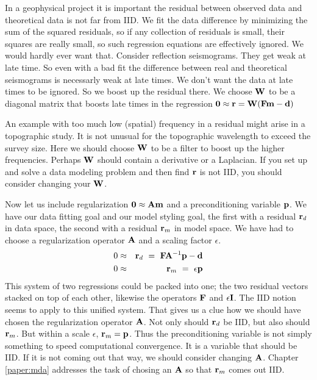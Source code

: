 \par
In a geophysical project
it is important the residual between observed data and theoretical data is not far from IID.
We fit the data difference by minimizing the sum of the squared residuals,
so if any collection of residuals is small,
their squares are really small,
so such regression equations are effectively ignored.
We would hardly ever want that.
Consider reflection seismograms.   They get weak at late time.
So even with a bad fit the difference between real and theoretical seismograms
is necessarly weak at late times.
We don't want the data at late times to be ignored.
So we boost up the residual there.
We choose $\bold W$ to be a diagonal matrix that boosts late times
in the regression $\bold 0 \approx \bold r = \bold W(\bold F\bold m-\bold d)$
\par
An example with too much low (spatial) frequency in a residual might arise in a topographic study.
It is not unusual for the topographic wavelength to exceed the survey size.
Here we should choose $\bold W$ to be a filter to boost up the higher frequencies.
Perhaps $\bold W$ should contain a derivative or a Laplacian.
If you set up and solve a data modeling problem
and then find $\bold r$ is not IID,
you should consider changing your $\bold W$.
\par
Now let us include regularization $\bold 0 \approx\bold A\bold m$
and a preconditioning variable $\bold p$.
We have our data fitting goal and our model styling goal,
the first with a residual $\bold r_d$
in data space, the second with a residual $\bold r_m$
in model space.
We have had to choose a regularization operator $\bold A$ and a scaling factor $\epsilon$.
\begin{eqnarray}
0 & \approx& \bold r_d  \ = \ \bold F \bold A^{-1}\bold p -\bold d 
\\
0 & \approx& \bold r_m  \ = \ \epsilon \bold p
\end{eqnarray}
This system of two regressions could be packed into one;
the two residual vectors stacked on top of each other,
likewise the operators $\bold F$ and $\epsilon \bold I$.
The IID notion seems to apply to this unified system.
That gives us a clue
how we should have chosen the regularization operator $\bold A$.
Not only should $\bold r_d$ be IID, but also should $\bold r_m$.
But within a scale $\epsilon$, $\bold r_m=\bold p$.
Thus the preconditioning variable is not simply something to speed computational convergence.
It is a variable that should be IID.
If it is not coming out that way, we should consider changing $\bold A$.
Chapter \ref{paper:mda} addresses the task of chosing an $\bold A$
so that $\bold r_m$ comes out IID.
\par
{}

